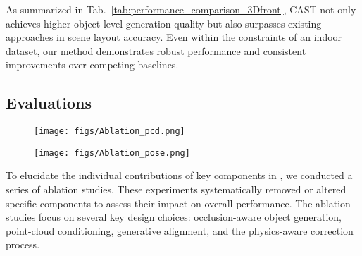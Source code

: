 As summarized in Tab.~\ref{tab:performance_comparison_3Dfront}, CAST not only achieves higher object-level generation quality but also surpasses existing approaches in scene layout accuracy. Even within the constraints of an indoor dataset, our method demonstrates robust performance and consistent improvements over competing baselines.



\subsection{Evaluations}


\begin{figure} []
  \centering
  \texttt{[image: figs/Ablation\_pcd.png]}
  \label{Ablation_pointscondition}
\end{figure}

\begin{figure} []
  \centering
  \texttt{[image: figs/Ablation\_pose.png]}
  \label{Ablation_icp_dr}
\end{figure}

To elucidate the individual contributions of key components in \methodname, we conducted a series of ablation studies. These experiments systematically removed or altered specific components to assess their impact on overall performance. The ablation studies focus on several key design choices: occlusion-aware object generation, point-cloud conditioning, generative alignment, and the physics-aware correction process.


